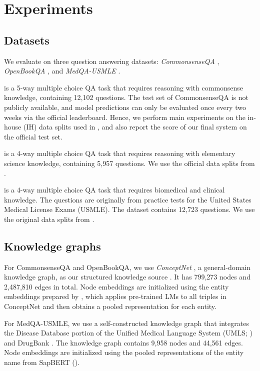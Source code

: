 \section{Experiments}\label{sec:experiment}
\subsection{Datasets}
We evaluate \methodname on three question answering datasets: \textit{CommonsenseQA} \cite{talmor2018commonsenseqa}, \textit{OpenBookQA} \cite{obqa}, and \textit{MedQA-USMLE} \cite{jin2021disease}.

 is a 5-way multiple choice QA task that requires reasoning with commonsense knowledge, containing 12,102 questions.
The test set of CommonsenseQA is not publicly available, and model predictions can only be evaluated once every two weeks via the official leaderboard. Hence, we perform main experiments on the {in-house (IH) data splits} used in \citet{lin2019kagnet}, and also report the score of our final system on the {official test} set.

 is a 4-way multiple choice QA task that requires reasoning with elementary science knowledge, containing 5,957 questions. We use the official data splits from \citet{mihaylov2018knowledgeable}. 

 is a 4-way multiple choice QA task that requires biomedical and clinical knowledge. The questions are originally from practice tests for the United States Medical License Exams (USMLE). The dataset contains 12,723 questions. We use the original data splits from \citet{jin2021disease}.


\subsection{Knowledge graphs}
\label{sec:experiment-kg}
For CommonsenseQA and OpenBookQA, we use \textit{ConceptNet} \cite{speer2016conceptnet}, a general-domain knowledge graph, as our structured knowledge source . It has 799,273
nodes and 2,487,810 edges in total. Node embeddings are initialized using the entity embeddings prepared by \citet{feng2020scalable}, which applies pre-trained LMs to all triples in ConceptNet and then obtains a pooled representation for each entity.

For MedQA-USMLE, we use a self-constructed knowledge graph that integrates the Disease Database portion of the Unified Medical Language System (UMLS; \citealp{bodenreider2004unified}) and DrugBank \cite{wishart2018drugbank}. The knowledge graph contains 9,958 nodes and 44,561 edges. Node embeddings are initialized using the pooled representations of the entity name from SapBERT (\citealp{liu2020self}).

